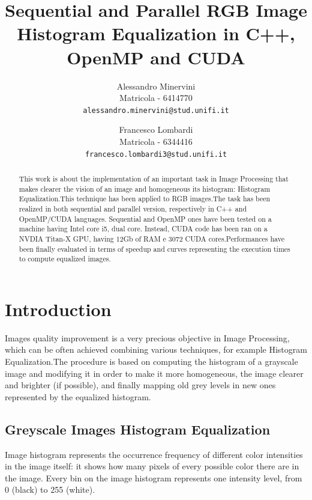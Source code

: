 \documentclass[10pt,twocolumn,letterpaper]{article}
\begin{document}
\title{Sequential and Parallel RGB Image Histogram Equalization in C++, OpenMP and CUDA}

\author{Alessandro Minervini\\
Matricola - 6414770\\
{\tt\small alessandro.minervini@stud.unifi.it}
\and
Francesco Lombardi\\
Matricola - 6344416\\
{\tt\small francesco.lombardi3@stud.unifi.it}
}

\maketitle

\begin{abstract}
	This work is about the implementation of an important task in Image Processing that makes clearer the vision of an image and homogeneous its histogram: Histogram Equalization.This technique has been applied to RGB images.The task has been realized in both sequential and parallel version, respectively in C++ and OpenMP/CUDA languages. Sequential and OpenMP ones have been tested on a machine having Intel core i5, dual core. Instead, CUDA code has been ran on a NVDIA Titan-X GPU, having 12Gb of RAM e 3072 CUDA cores.Performances have been finally evaluated in terms of speedup and curves representing the execution times to compute equalized images.
\end{abstract}

\section{Introduction}
Images quality improvement is a very precious objective in Image Processing, which can be often achieved combining various techniques, for example Histogram Equalization.The procedure is based on computing the histogram of a grayscale image and modifying it in order to make it more homogeneous, the image clearer and brighter (if possible), and finally mapping old grey levels in new ones represented by the equalized histogram.

\subsection{Greyscale Images Histogram Equalization}
Image histogram represents the occurrence frequency of different color intensities in the image itself: it shows how many pixels of every possible color there are in the image. Every bin on the image histogram represents one intensity level, from 0 (black) to 255 (white). 
\end{document}
